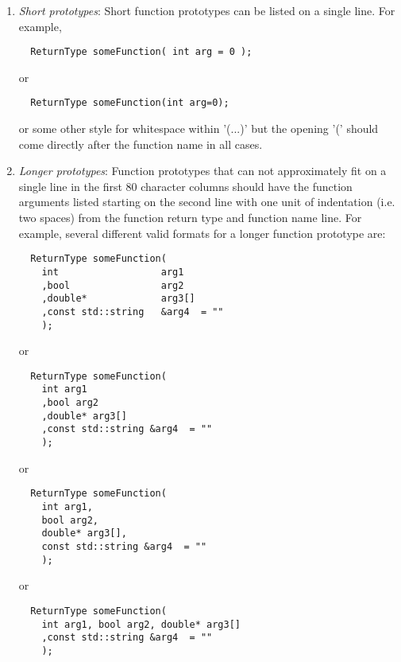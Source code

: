 \begin{enumerate}
  \begin{enumerate}

  {}\item\textit{Short prototypes}: Short function prototypes can be listed
  on a single line.  For example,

  {\small\begin{verbatim}
  ReturnType someFunction( int arg = 0 );
  \end{verbatim}}

  or 

  {\small\begin{verbatim}
  ReturnType someFunction(int arg=0);
  \end{verbatim}}

  or some other style for whitespace within '(...)' but the opening '(' should
  come directly after the function name in all cases.

  {}\item\textit{Longer prototypes}: Function prototypes that can not
  approximately fit on a single line in the first 80 character columns should
  have the function arguments listed starting on the second line with one unit
  of indentation (i.e. two spaces) from the function return type and function
  name line.  For example, several different valid formats for a longer
  function prototype are:

  {\small\begin{verbatim}
  ReturnType someFunction(
    int                  arg1
    ,bool                arg2
    ,double*             arg3[]
    ,const std::string   &arg4  = ""
    );
  \end{verbatim}}
  
  or
  
  {\small\begin{verbatim}
  ReturnType someFunction(
    int arg1
    ,bool arg2
    ,double* arg3[]
    ,const std::string &arg4  = ""
    );
  \end{verbatim}}
  
  or
  
  {\small\begin{verbatim}
  ReturnType someFunction(
    int arg1,
    bool arg2,
    double* arg3[],
    const std::string &arg4  = ""
    );
  \end{verbatim}}
  
  or
  
  {\small\begin{verbatim}
  ReturnType someFunction(
    int arg1, bool arg2, double* arg3[]
    ,const std::string &arg4  = ""
    );
  \end{verbatim}}
  

\end{enumerate}
\end{enumerate}
